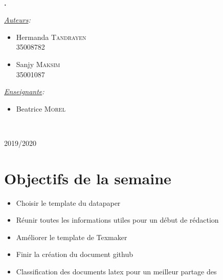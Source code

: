 \documentclass[11pt,oneside]{article}
\begin{document}
\begin{titlepage}
\phantom{aaaaaaaaaaaaaaaaaaaaaaaaaaaaaaaaaaaaaaa
ytrfdytfugvghikuhjbiujbhaaaaaaaaaaaaaaa}
\center
\fbox{\begin{minipage}[t][1cm][c]{8cm}
\begin{center}
{\huge \bfseries \textcolor{Rapport}{Feuille de Route}}
\end{center}
\end{minipage}}\\[0.5cm]
\textbf{\Large \color{Mulberry} .}\\[0.5cm] 
\begin{minipage}{0.5\textwidth}
\begin{flushleft} \large
\hspace{0.22\textwidth}\emph{\underline{Auteurs}:}\\
\begin{multicols}{2}
\begin{itemize}[font=\color{airforceblue} \Large, label=, leftmargin=0cm]
\item{Hermanda \textsc{Tandrayen} \\ {\small{35008782}}}
\item{Sanjy \textsc{Maksim} \\ {\small{35001087}}}
\end{itemize}
\end{multicols}
\end{flushleft}
\end{minipage}
\begin{minipage}{0.45\textwidth}
\begin{flushright} \large
\emph{\underline{Enseignante}:}\phantom{aaaaa}\\
\begin{itemize}[font=\color{amber} \Large, label=, leftmargin=3.5cm]
\item{Beatrice \textsc{Morel}}
\end{itemize}
\end{flushright}
\end{minipage}\\[0cm]
\vspace{10cm} 
\begin{center}
2019/2020
\end{center}
\vfill
\end{titlepage}


\newpage
\part*{Objectifs de la semaine}
\begin{itemize}
	\item Choisir le template du datapaper
	\item Réunir toutes les informations utiles pour un début de rédaction
	\item Améliorer le template de Texmaker
	\item Finir la création du document github 
	\item Classification des documents latex pour un meilleur partage des
\end{itemize}
\end{document}
